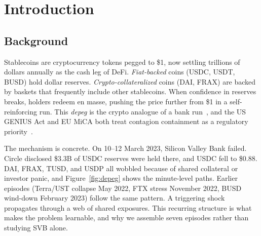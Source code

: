 \documentclass[sigconf,anonymous]{acmart}
\begin{document}
\maketitle

\section{Introduction}

\subsection{Background}
Stablecoins are cryptocurrency tokens pegged to \$1, now settling trillions of dollars annually as
the cash leg of DeFi. \emph{Fiat-backed} coins (USDC, USDT, BUSD) hold dollar reserves.
\emph{Crypto-collateralized} coins (DAI, FRAX) are backed by baskets that frequently include other
stablecoins. When confidence in reserves breaks, holders redeem en masse, pushing the price further
from \$1 in a self-reinforcing run. This \emph{depeg} is the crypto analogue of a bank
run~\cite{diamond1983bank}, and the US GENIUS Act and EU MiCA both treat contagion containment as
a regulatory priority~\cite{genius2025,mica2023}.

The mechanism is concrete. On 10--12 March 2023, Silicon Valley Bank failed. Circle disclosed
\$3.3B of USDC reserves were held there, and USDC fell to \$0.88. DAI, FRAX, TUSD, and USDP all
wobbled because of shared collateral or investor panic, and Figure~\ref{fig:depeg} shows the minute-level
paths. Earlier episodes (Terra/UST collapse May 2022, FTX stress November 2022, BUSD wind-down
February 2023) follow the same pattern. A triggering shock propagates through a web of shared
exposures. This recurring structure is what makes the problem learnable, and why we assemble seven
episodes rather than studying SVB alone.
\end{document}
